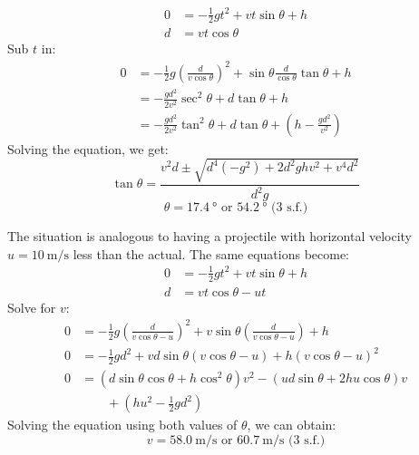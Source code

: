 \begin{solution}
\begin{subsolution}
\begin{center}
        \end{center}
    
        \begin{align}
            0 &= -\frac{1}{2}gt^2 + vt\sin\theta + h \\
            d &= vt\cos\theta 
        \end{align}
        Sub $t$ in:
        \begin{align}
        0 &= -\frac{1}{2}g\left(\frac{d}{v\cos\theta}\right)^2 + \sin\theta\frac{d}{\cos\theta} \tan\theta + h \\
        &= -\frac{gd^2}{2v^2}\sec^2\theta  + d\tan\theta + h \\
        &= -\frac{gd^2}{2v^2} \tan^2\theta + d\tan\theta + \left(h -\frac{gd^2}{v^2}\right)
        \end{align}
        Solving the equation, we get:
        \[\tan\theta = \frac{v^2 d\pm \sqrt{d^4 \left(-g^2\right)+2 d^2 g h v^2+v^4d^2}}{d^2 g}\]
        \[\theta = \boxed{\qty{17.4}{\degree} \text{ or } \qty{54.2}{\degree}}\text{ (3 s.f.)}\]
    \end{subsolution}
    \begin{subsolution}
        The situation is analogous to having a projectile with horizontal velocity $u=\qty{10}{\m\per\s}$ less than the actual. The same equations become: 
        \begin{align}
            0 &= -\frac{1}{2}gt^2 + vt\sin\theta + h \\
            d &= vt\cos\theta - ut
        \end{align}
        Solve for $v$: 
        \begin{align*}
            0 &= -\frac{1}{2}g\left(\frac{d}{v\cos\theta-u}\right)^2 + v\sin\theta\left(\frac{d}{v\cos\theta-u}\right) + h\\
            0 &= -\frac{1}{2}gd^2 + vd\sin\theta\left(v\cos\theta-u\right) + h(v\cos\theta-u)^2\\
            0 &= (d\sin\theta\cos\theta+h\cos^2\theta)v^2 - (ud\sin\theta+2hu\cos\theta)v\\
            &\qquad+ \left(hu^2-\frac{1}{2}gd^2\right)
        \end{align*}
        Solving the equation using both values of $\theta$, we can obtain:
        \[v=\boxed{\qty{58.0}{\m\per\s}\text{ or }\qty{60.7}{\m\per\s}}\text{ (3 s.f.)}\]
    \end{subsolution}
\end{solution}

